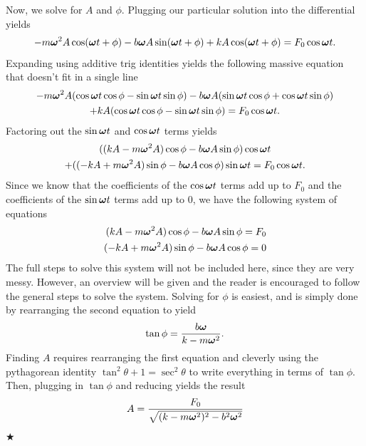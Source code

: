 \noindent Now, we solve for $A$ and $\phi$. Plugging our particular solution into the differential yields
\begin{gather*}
    -m\boldsymbol{\omega}^2A\cos(\boldsymbol{\omega} t +\phi)-b\boldsymbol{\omega} A\sin(\boldsymbol{\omega} t+\phi)+kA\cos(\boldsymbol{\omega} t+\phi) = F_0\cos\boldsymbol{\omega} t.
\end{gather*}
\noindent Expanding using additive trig identities yields the following massive equation that doesn't fit in a single line
\begin{gather*}
        -m\boldsymbol{\omega}^2 A(\cos\boldsymbol{\omega} t\cos\phi-\sin\boldsymbol{\omega} t\sin\phi) - b\boldsymbol{\omega} A(\sin\boldsymbol{\omega} t\cos\phi+\cos\boldsymbol{\omega} t\sin\phi)\\+kA(\cos\boldsymbol{\omega} t\cos\phi-\sin\boldsymbol{\omega} t\sin\phi) = F_0\cos\boldsymbol{\omega} t.
\end{gather*}
\noindent Factoring out the $\sin\boldsymbol{\omega} t$ and $\cos\boldsymbol{\omega} t$ terms yields
\begin{gather*}
    ((kA-m\boldsymbol{\omega}^2A)\cos\phi - b\boldsymbol{\omega} A\sin\phi)\cos\boldsymbol{\omega} t \\+ ((-kA+m\boldsymbol{\omega}^2A)\sin\phi - b\boldsymbol{\omega} A\cos\phi)\sin\boldsymbol{\omega} t = F_0\cos\boldsymbol{\omega} t.
\end{gather*}
\noindent Since we know that the coefficients of the $\cos\boldsymbol{\omega} t$ terms add up to $F_0$ and the coefficients of the $\sin\boldsymbol{\omega} t$ terms add up to $0$, we have the following system of equations
\begin{align}
    (kA-m\boldsymbol{\omega}^2A)\cos\phi - b\boldsymbol{\omega} A\sin\phi = F_0 \\
    (-kA+m\boldsymbol{\omega}^2A)\sin\phi - b\boldsymbol{\omega} A\cos\phi = 0
\end{align}
\noindent The full steps to solve this system will not be included here, since they are very messy. However, an overview will be given and the reader is encouraged to follow the general steps to solve the system. Solving for $\phi$ is easiest, and is simply done by rearranging the second equation to yield
\begin{equation}
    \tan\phi = \frac{b\boldsymbol{\omega}}{k-m\boldsymbol{\omega}^2}.
\end{equation}
\noindent Finding $A$ requires rearranging the first equation and cleverly using the pythagorean identity $\tan^2\theta + 1 =\sec^2\theta$ to write everything in terms of $\tan\phi$. Then, plugging in $\tan\phi$ and reducing yields the result
\begin{equation}
    A = \frac{F_0}{\sqrt{(k-m\boldsymbol{\omega}^2)^2-b^2\boldsymbol{\omega}^2}}
\end{equation}
$\bigstar$

\newpage

%
%
%
%

